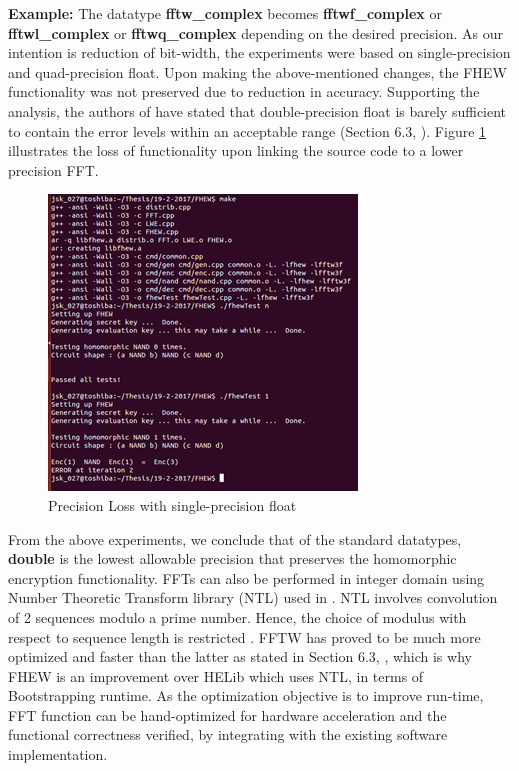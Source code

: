\textbf{Example:} The datatype \textbf{fftw\_complex} becomes \textbf{fftwf\_complex} or \textbf{fftwl\_complex} or \textbf{fftwq\_complex }depending on the desired precision.\newline \newline
As our intention is reduction of bit-width, the experiments were based on single-precision and quad-precision float. Upon making the above-mentioned changes, the FHEW functionality was not preserved due to reduction in accuracy. Supporting the analysis, the authors of \cite{ducas2015fhew} have stated that double-precision float is barely sufficient to contain the error levels within an acceptable range (Section 6.3, \cite{ducas2015fhew}). Figure \ref{fig:fft_precision_loss} illustrates the loss of functionality upon linking the source code to a lower precision FFT.
\begin{figure}[h!]
 \centering
 \includegraphics[width=0.5\linewidth]{figures/fft_precision_loss.png}
 \caption{Precision Loss with single-precision float}
 \label{fig:fft_precision_loss}
\end{figure}
From the above experiments, we conclude that of the standard datatypes, \textbf{double} is the lowest allowable precision that preserves the homomorphic encryption functionality. \newline\newline
FFTs can also be performed in integer domain using Number Theoretic Transform library (NTL) used in \cite{helib}. NTL involves convolution of 2 sequences modulo a prime number. Hence, the choice of modulus with respect to sequence length is restricted \cite{bhattacharya2004some}. FFTW has proved to be much more optimized and faster than the latter as stated in Section 6.3, \cite{ducas2015fhew}, which is why FHEW is an improvement over HELib \cite{shai_he} which uses NTL, in terms of Bootstrapping runtime. As the optimization objective is to improve run-time, FFT function can be hand-optimized for hardware acceleration and the functional correctness verified, by integrating with the existing software implementation.
